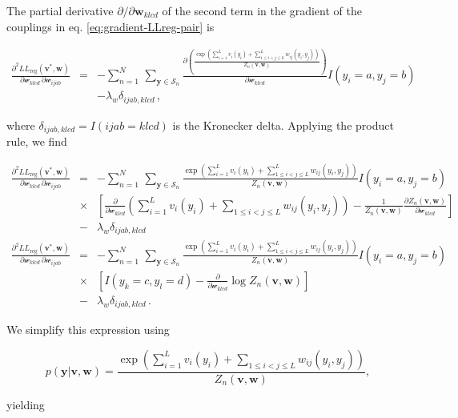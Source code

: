 \documentclass[12pt,a4paper,twoside]{book}
\newcommand{\eq}{\!=\!}
\newcommand{\LLreg}{L\!L_\mathrm{reg}}
\newcommand{\Sn}{\mathcal{S}_n}
\renewcommand{\v}{\mathbf{v}}
\newcommand{\w}{\mathbf{w}}
\newcommand{\wijab}{\mathcal{w}_{ijab}}
\newcommand{\wklcd}{\mathcal{w}_{klcd}}
\theoremstyle{definition}
\theoremstyle{definition}
\theoremstyle{remark}
\begin{document}
The partial derivative \(\partial / \partial \w_{klcd}\) of the second
term in the gradient of the couplings in eq.
\eqref{eq:gradient-LLreg-pair} is

\begin{eqnarray}
    \frac{\partial^2 \LLreg(\v^*,\w)}{\partial \wklcd \, \partial \wijab } 
    &=&  - \sum_{n=1}^{N} \, \sum_{\mathbf{y} \in \Sn} \frac{\partial \left( \frac{\exp \left( \sum_{i=1}^L v_i(y_i) + \sum_{1 \le i < j \le L}^L w_{ij}(y_i,y_j) \right) }{Z_n(\v,\w)} \right)}{\partial \wklcd}   I(y_i \eq a, y_j \eq b) \\
    &&- \lambda_w \delta_{ijab,klcd} \,,
\end{eqnarray}

where \(\delta_{ijab,klcd} = I(ijab=klcd)\) is the Kronecker delta.
Applying the product rule, we find

\begin{eqnarray}
    \frac{\partial^2 \LLreg(\v^*,\w)}{\partial \wklcd \, \partial \wijab  } 
    &=&  - \sum_{n=1}^{N} \, \sum_{\mathbf{y} \in \Sn} \frac{\exp \left(\sum_{i=1}^L v_i(y_i) + \sum_{1 \le i < j \le L}^L w_{ij}(y_i,y_j)  \right)}{Z_n(\v,\w)}  I(y_i \eq a, y_j \eq b) \\
    & \times & \left[ \frac{\partial}{\partial \wklcd} \left( \sum_{i=1}^L v_i(y_i) + \sum_{1 \le i < j \le L}  w_{ij}(y_i,y_j)  \right) 
                  - \frac{1}{Z_n(\v,\w)} \frac{\partial  Z_n(\v,\w) }{\partial\wklcd} \right] \\
    &-& \lambda_w \delta_{ijab,klcd} \\
    \frac{\partial^2 \LLreg(\v^*,\w)}{\partial \wklcd \, \partial \wijab  } 
    &=&  - \sum_{n=1}^{N} \, \sum_{\mathbf{y} \in \Sn} \frac{\exp \left(\sum_{i=1}^L v_i(y_i) + \sum_{1 \le i < j \le L}^L w_{ij}(y_i,y_j)  \right)}{Z_n(\v,\w)}  I(y_i \eq a, y_j \eq b) \\
    & \times & \left[ I(y_k \eq c, y_l \eq d) - \frac{\partial}{\partial \wklcd} \log Z_n(\v,\w) \right] \\
    &-& \lambda_w \delta_{ijab,klcd} \,.
\end{eqnarray}

We simplify this expression using

\begin{equation}
    p(\mathbf{y} | \v,\w) = \frac{\exp \left( \sum_{i=1}^L v_i(y_i) + \sum_{1 \le i < j \le L} w_{ij}(y_i,y_j) \right)}{Z_n(\v,\w)}  ,
\end{equation}

yielding
\end{document}
